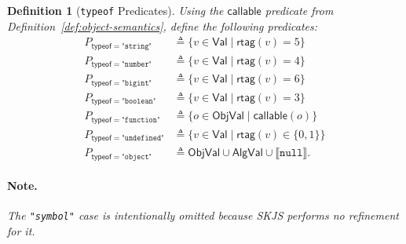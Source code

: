 \documentclass[11pt]{article}
\newtheorem{definition}[theorem]{Definition}
\newcommand{\sem}[1]{\llbracket #1 \rrbracket}
\newcommand{\ObjVal}{\mathsf{ObjVal}}
\newcommand{\AlgVal}{\mathsf{AlgVal}}
\newcommand{\rtag}{\mathsf{rtag}}
\newcommand{\Val}{\mathsf{Val}}
\begin{document}
\begin{definition}[\texttt{typeof} Predicates]
\label{def:typeof-predicates}
Using the $\mathsf{callable}$ predicate from Definition~\ref{def:object-semantics}, define the following predicates:
\begin{align*}
P_{\mathsf{typeof}=\texttt{"string"}} &\triangleq \{ v \in \Val \mid \rtag(v)=5 \} \\
P_{\mathsf{typeof}=\texttt{"number"}} &\triangleq \{ v \in \Val \mid \rtag(v)=4 \} \\
P_{\mathsf{typeof}=\texttt{"bigint"}} &\triangleq \{ v \in \Val \mid \rtag(v)=6 \} \\
P_{\mathsf{typeof}=\texttt{"boolean"}} &\triangleq \{ v \in \Val \mid \rtag(v)=3 \} \\
P_{\mathsf{typeof}=\texttt{"function"}} &\triangleq \{ o \in \ObjVal \mid \mathsf{callable}(o) \} \\
P_{\mathsf{typeof}=\texttt{"undefined"}} &\triangleq \{ v \in \Val \mid \rtag(v)\in\{0,1\} \} \\
P_{\mathsf{typeof}=\texttt{"object"}} &\triangleq \ObjVal \cup \AlgVal \cup \sem{\texttt{null}}.
\end{align*}
\paragraph{Note.}
The \texttt{"symbol"} case is intentionally omitted because SKJS performs no refinement for it.
\end{definition}
\end{document}
